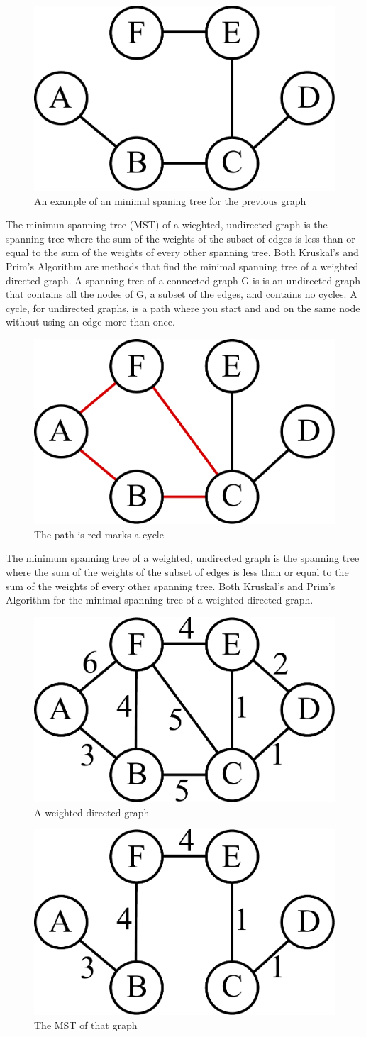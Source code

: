 \begin{figure}[H]
\includegraphics[width = .4\textwidth]{graph2.pdf}
\caption{An example of an minimal spaning tree for the previous graph}
\end{figure}
The minimun spanning tree (MST) of a wieghted, undirected graph is the spanning tree where the sum of the weights of the subset of edges is less than or equal to the sum of the weights of every other spanning tree. Both Kruskal's and Prim's Algorithm are methods that find the minimal spanning tree of a weighted directed graph.
A spanning tree of a connected graph G is is an undirected graph that contains all the nodes of G, a subset of the edges, and contains no cycles. A cycle, for undirected graphs, is a path where you start and and on the same node without using an edge more than once. 
\begin{figure}[H]
\includegraphics[width = .4\textwidth]{graph3.pdf}
\caption{The path is red marks a cycle}
\end{figure}
The minimum spanning tree of a weighted, undirected graph is the spanning tree where the sum of the weights of the subset of edges is less than or equal to the sum of the weights of every other spanning tree. Both Kruskal's and Prim's Algorithm for the minimal spanning tree of a weighted directed graph.
\begin{figure}[H]
\includegraphics[width = .4\textwidth]{graph4.pdf}
\caption{A weighted directed graph}
\end{figure}
\begin{figure}[H]
\includegraphics[width = .4\textwidth]{graph5.pdf}
\caption{The MST of that graph}
\end{figure}

